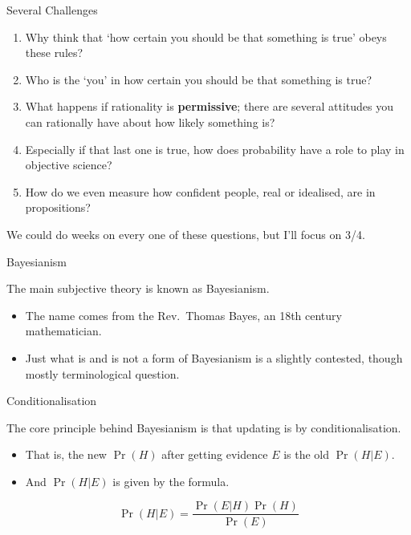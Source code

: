 \documentclass[
  ignorenonframetext,
]{beamer}
\providecommand{\tightlist}{%
  \setlength{\itemsep}{0pt}\setlength{\parskip}{0pt}}
\renewcommand{\,}{\text{, }}
\begin{document}
\begin{frame}{Several Challenges}
\protect\hypertarget{several-challenges}{}

\begin{enumerate}
\tightlist
\item
  Why think that `how certain you should be that something is true'
  obeys these rules? \pause
\item
  Who is the `you' in how certain you should be that something is true?
  \pause
\item
  What happens if rationality is \textbf{permissive}; there are several
  attitudes you can rationally have about how likely something is?
  \pause
\item
  Especially if that last one is true, how does probability have a role
  to play in objective science? \pause
\item
  How do we even measure how confident people, real or idealised, are in
  propositions? \pause
\end{enumerate}

We could do weeks on every one of these questions, but I'll focus on
3/4.

\end{frame}

\begin{frame}{Bayesianism}
\protect\hypertarget{bayesianism}{}

The main subjective theory is known as Bayesianism.

\begin{itemize}
\tightlist
\item
  The name comes from the Rev.~Thomas Bayes, an 18th century
  mathematician.
\item
  Just what is and is not a form of Bayesianism is a slightly contested,
  though mostly terminological question.
\end{itemize}

\end{frame}

\begin{frame}{Conditionalisation}
\protect\hypertarget{conditionalisation}{}

The core principle behind Bayesianism is that updating is by
conditionalisation.

\begin{itemize}
\tightlist
\item
  That is, the new \(\Pr(H)\) after getting evidence \(E\) is the old
  \(\Pr(H | E)\).
\item
  And \(\Pr(H | E)\) is given by the formula.
\end{itemize}

\[
\Pr(H | E) = \frac{\Pr(E | H)\Pr(H)}{\Pr(E)}
\]

\end{frame}
\end{document}
